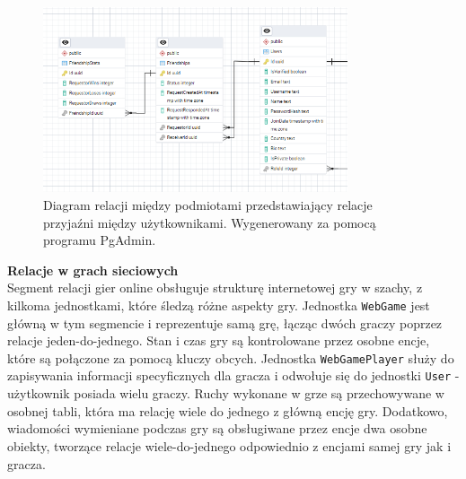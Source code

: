 \documentclass[twoside]{projektInzynierskiMS1}
\begin{document}
\vspace{0.5cm}
\begin{figure}[h!]
    \centering
    \includegraphics[width=0.8\textwidth]{images/ERD_friendship.png}
    \caption{Diagram relacji między podmiotami przedstawiający relacje przyjaźni między użytkownikami. Wygenerowany za pomocą programu PgAdmin.}
\end{figure}

\newpage

\noindent \textbf{Relacje w grach sieciowych}\\
Segment relacji gier online obsługuje strukturę internetowej gry w szachy, z kilkoma jednostkami, które śledzą różne aspekty gry. Jednostka \texttt{WebGame} jest główną w tym segmencie i reprezentuje samą grę, łącząc dwóch graczy poprzez relacje jeden-do-jednego. Stan i czas gry są kontrolowane przez osobne encje, które są połączone za pomocą kluczy obcych. Jednostka \texttt{WebGamePlayer} służy do zapisywania informacji specyficznych dla gracza i odwołuje się do jednostki \texttt{User} - użytkownik posiada wielu graczy. Ruchy wykonane w grze są przechowywane w osobnej tabli, która ma relację wiele do jednego z główną encję gry. Dodatkowo, wiadomości wymieniane podczas gry są obsługiwane przez encje dwa osobne obiekty, tworzące relacje wiele-do-jednego odpowiednio z encjami samej gry jak i gracza.
\end{document}
